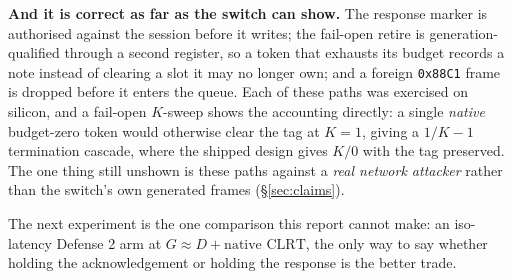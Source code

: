 \documentclass[10pt,a4paper,oneside]{article}
\newcommand{\code}[1]{\texttt{\small #1}}
\begin{document}
\textbf{And it is correct as far as the switch can show.} The response marker is authorised
against the session before it writes; the fail-open retire is generation-qualified through a
second register, so a token that exhausts its budget records a note instead of clearing a slot
it may no longer own; and a foreign \code{0x88C1} frame is dropped before it enters the queue.
Each of these paths was exercised on silicon, and a fail-open $K$-sweep shows the accounting
directly: a single \emph{native} budget-zero token would otherwise clear the tag at $K=1$,
giving a $1/K{-}1$ termination cascade, where the shipped design gives $K/0$ with the tag
preserved. The one thing still unshown is these paths against a \emph{real network attacker}
rather than the switch's own generated frames (\S\ref{sec:claims}).

The next experiment is the one comparison this report cannot make: an iso-latency Defense 2
arm at $G\approx D+\text{native CLRT}$, the only way to say whether holding the
acknowledgement or holding the response is the better trade.
\end{document}

